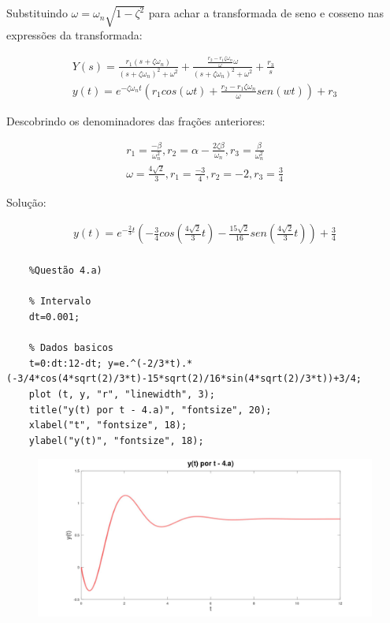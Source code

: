 \documentclass[10pt]{article}
\begin{document}
Substituindo $\omega = \omega_n \sqrt{1 - \zeta^2}$ para achar a transformada de seno e cosseno nas expressões da transformada:

\begin{align*}
    Y(s) = \frac{r_1(s + \zeta \omega_n)}{(s + \zeta \omega_n)^2 + \omega^2} + \frac{\frac{r_2 - r_1 \zeta \omega_n}{\omega} \omega}{(s + \zeta \omega_n)^2 + \omega^2} + \frac{r_3}{s} \\
    y(t) = e^{- \zeta \omega_n t}(r_1 cos(\omega t) + \frac{r_2 - r_1 \zeta \omega_n}{\omega}sen(wt)) + r_3
\end{align*}

Descobrindo os denominadores das frações anteriores:

\begin{align*}
    r_1 = \frac{-\beta}{\omega_n^2}, r_2 = \alpha - \frac{2 \zeta \beta}{\omega_n}, r_3 = \frac{\beta}{\omega_n^2} \\
    \omega = \frac{4 \sqrt{2}}{3}, r_1 = \frac{-3}{4}, r_2 = -2, r_3 = \frac{3}{4}
\end{align*}

Solução:

\begin{align*}
    y(t) = e^{-\frac{2}{3}t} \left(-\frac{3}{4}cos\left(\frac{4 \sqrt{2}}{3}t\right) - \frac{15 \sqrt{2}}{16} sen\left(\frac{4 \sqrt{2}}{3}t\right)\right) + \frac{3}{4} \\
\end{align*}

\begin{verbatim}
    %Questão 4.a)

    % Intervalo
    dt=0.001;

    % Dados basicos
    t=0:dt:12-dt; y=e.^(-2/3*t).*(-3/4*cos(4*sqrt(2)/3*t)-15*sqrt(2)/16*sin(4*sqrt(2)/3*t))+3/4;
    plot (t, y, "r", "linewidth", 3);
    title("y(t) por t - 4.a)", "fontsize", 20);
    xlabel("t", "fontsize", 18);
    ylabel("y(t)", "fontsize", 18);
\end{verbatim}

\begin{figure}[h]
    \includegraphics[scale=0.15]{questao4a.jpg}
    \centering
\end{figure}
\end{document}
